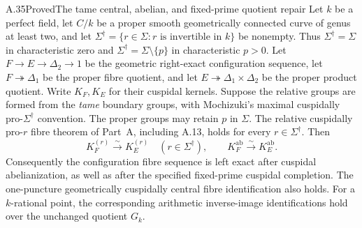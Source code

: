 \begin{claim}{A.35}{Proved}{The tame central, abelian, and fixed-prime quotient repair}
Let $k$ be a perfect field, let $C/k$ be a proper smooth
geometrically connected curve of genus at least two, and let
$\Sigma^\dagger=\{r\in\Sigma:r\text{ is invertible in }k\}$
be nonempty. Thus $\Sigma^\dagger=\Sigma$ in characteristic
zero and $\Sigma^\dagger=\Sigma\setminus\{p\}$ in
characteristic $p>0$.
Let $F\to E\to\Delta_2\to1$ be the geometric right-exact configuration
sequence, let $F\twoheadrightarrow\Delta_1$ be the proper fibre quotient,
and let $E\twoheadrightarrow\Delta_1\times\Delta_2$ be the proper product
quotient. Write $K_F,K_E$ for their cuspidal kernels. Suppose the relative
groups are formed from the \emph{tame} boundary groups, with Mochizuki's
maximal cuspidally pro-$\Sigma^\dagger$ convention. The proper groups
may retain $p$ in $\Sigma$. The relative cuspidally pro-$r$ fibre
theorem of Part~A, including A.13, holds for every
$r\in\Sigma^\dagger$.
Then
\[
 K_F^{(r)}\xrightarrow{\sim}K_E^{(r)}\quad(r\in\Sigma^\dagger),
 \qquad K_F^{\mathrm{ab}}\xrightarrow{\sim}K_E^{\mathrm{ab}}.
\]
Consequently the configuration fibre sequence is left exact after
cuspidal abelianization, as well as after the specified fixed-prime
cuspidal completion. The one-puncture geometrically cuspidally central
fibre identification also holds. For a $k$-rational point, the
corresponding arithmetic inverse-image identifications hold over
the unchanged quotient $G_k$.
\end{claim}

